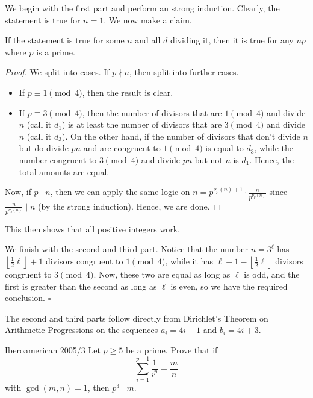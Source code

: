\documentclass{article}
\begin{document}
We begin with the first part and perform an strong induction. Clearly, the statement is true for $n = 1$. We now make a claim.
\begin{claim*}
If the statement is true for some $n$ and all $d$ dividing it, then it is true for any $np$ where $p$ is a prime.
\end{claim*}
\begin{proof}
We split into cases. If $p \nmid n$, then split into further cases.
\begin{itemize}
\item If $p \equiv 1 \pmod{4}$, then the result is clear.
\item If $p \equiv 3 \pmod{4}$, then the number of divisors that are $1 \pmod{4}$ and divide $n$ (call it $d_1$) is at least the number of divisors that are $3 \pmod{4}$ and divide $n$ (call it $d_3$). On the other hand, if the number of divisors that don't divide $n$ but do divide $pn$ and are congruent to $1 \pmod{4}$ is equal to $d_3$, while the number congruent to $3 \pmod{4}$ and divide $pn$ but not $n$ is $d_1$. Hence, the total amounts are equal.
\end{itemize}
Now, if $p \mid n$, then we can apply the same logic on $n = p^{\nu_p(n)+1}\cdot \tfrac{n}{p^{\nu_p(n)}}$ since $\tfrac{n}{p^{\nu_p(n)}} \mid n$ (by the strong induction). Hence, we are done.
\end{proof}
This then shows that all positive integers work.

We finish with the second and third part. Notice that the number $n = 3^{\ell}$ has $\left\lfloor\tfrac{1}{2}\ell\right\rfloor+1$ divisors congruent to $1 \pmod{4}$, while it has $\ell+1-\left\lfloor\tfrac{1}{2}\ell\right\rfloor$ divisors congruent to $3 \pmod{4}$. Now, these two are equal as long as $\ell$ is odd, and the first is greater than the second as long as $\ell$ is even, so we have the required conclusion. $\square$

\begin{remark*}
The second and third parts follow directly from Dirichlet's Theorem on Arithmetic Progressions on the sequences $a_i = 4i+1$ and $b_i = 4i+3$.
\end{remark*}

\begin{problem}[2.14.10]{Iberoamerican 2005/3}
Let $p \ge 5$ be a prime. Prove that if \[\sum_{i=1}^{p-1}\dfrac{1}{i^p} = \dfrac{m}{n}\] with $\gcd(m, n) = 1$, then $p^3 \mid m$.
\end{problem}
\end{document}
